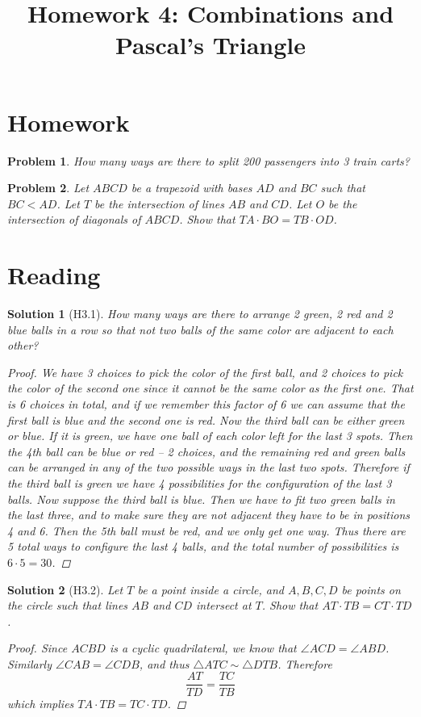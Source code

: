 \documentclass[a4paper,12pt]{article}
\title{Homework 4: Combinations and Pascal's Triangle}
\theoremstyle{perfect}
\newtheorem{prb}{Problem}
\newtheorem{sol}{Solution}
\begin{document}
 
\maketitle

\section{Homework}

\begin{prb}
How many ways are there to split 200 passengers into 3 train carts?
\end{prb}

\begin{prb}
Let $ABCD$ be a trapezoid with bases $AD$ and $BC$ such that $BC < AD$. Let $T$ be the intersection of lines $AB$ and $CD$. Let $O$ be the intersection of diagonals of $ABCD$. Show that $TA\cdot BO = TB\cdot OD$.
\end{prb}

\section{Reading}

\begin{sol}[H3.1]
\textit{How many ways are there to arrange 2 green, 2 red and 2 blue balls in a row so that not two balls of the same color are adjacent to each other?}
\begin{proof}
We have 3 choices to pick the color of the first ball, and 2 choices to pick the color of the second one since it cannot be the same color as the first one. That is 6 choices in total, and if we remember this factor of 6 we can assume that the first ball is blue and the second one is red. Now the third ball can be either green or blue. If it is green, we have one ball of each color left for the last 3 spots. Then the 4th ball can be blue or red -- 2 choices, and the remaining red and green balls can be arranged in any of the two possible ways in the last two spots. Therefore if the third ball is green we have 4 possibilities for the configuration of the last 3 balls. Now suppose the third ball is blue. Then we have to fit two green balls in the last three, and to make sure they are not adjacent they have to be in positions 4 and 6. Then the 5th ball must be red, and we only get one way. Thus there are 5 total ways to configure the last 4 balls, and the total number of possibilities is $6 \cdot 5 = 30$.
\end{proof}
\end{sol}

\begin{sol}[H3.2]
\textit{Let $T$ be a point inside a circle, and $A, B, C, D$ be points on the circle such that lines $AB$ and $CD$ intersect at $T$. Show that $AT\cdot TB = CT \cdot TD$.}
\begin{proof}
Since $ACBD$ is a cyclic quadrilateral, we know that $\angle ACD = \angle ABD$. Similarly $\angle CAB = \angle CDB$, and thus $\triangle ATC \sim \triangle DTB$. Therefore $$\frac{AT}{TD} = \frac{TC}{TB}$$ which implies $TA\cdot TB = TC \cdot TD$.
\end{proof}
\end{sol}
\end{document}
